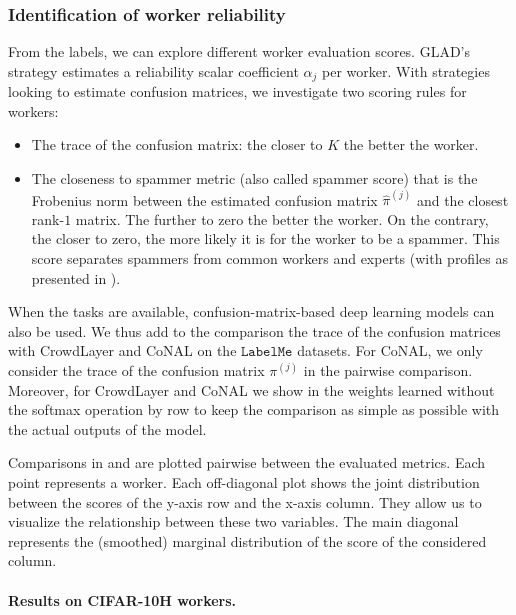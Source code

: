 \subsubsection{Identification of worker reliability}

From the labels, we can explore different worker evaluation scores.
GLAD's strategy estimates a reliability scalar coefficient $\alpha_j$ per worker.
With strategies looking to estimate confusion matrices, we investigate two scoring rules for workers:
\begin{itemize}
    \item The trace of the confusion matrix: the closer to $K$ the better the worker.
    \item The closeness to spammer metric \citep{raykar_ranking_2011} (also called spammer score) that is the Frobenius norm between the estimated confusion matrix $\hat{\pi}^{(j)}$ and the closest rank-$1$ matrix. The further to zero the better the worker. On the contrary, the closer to zero, the more likely it is for the worker to be a spammer. This score separates spammers from common workers and experts (with profiles as presented in ).
\end{itemize}

When the tasks are available, confusion-matrix-based deep learning models can also be used.
We thus add to the comparison the trace of the confusion matrices with CrowdLayer and CoNAL on the $\texttt{LabelMe}$ datasets.
For CoNAL, we only consider the trace of the confusion matrix $\pi^{(j)}$ in the pairwise comparison.
Moreover, for CrowdLayer and CoNAL we show in  the weights learned without the softmax operation by row to keep the comparison as simple as possible with the actual outputs of the model.

Comparisons in  and  are plotted pairwise between the evaluated metrics.
Each point represents a worker.
Each off-diagonal plot shows the joint distribution between the scores of the y-axis row and the x-axis column.
They allow us to visualize the relationship between these two variables.
The main diagonal represents the (smoothed) marginal distribution of the score of the considered column.

\paragraph{Results on CIFAR-10H workers.}

